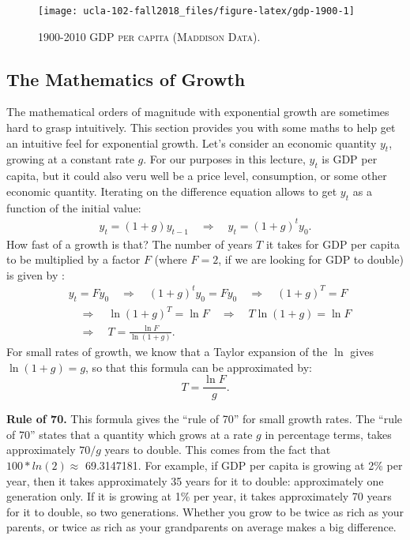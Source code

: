 \documentclass[]{book}
\theoremstyle{definition}
\theoremstyle{definition}
\theoremstyle{definition}
\theoremstyle{remark}
\begin{document}
\begin{figure}

{\centering \texttt{[image: ucla-102-fall2018\_files/figure-latex/gdp-1900-1]} 

}

\caption{\textsc{1900-2010 GDP per capita (Maddison Data)}.}\label{fig:gdp-1900}
\end{figure}

\subsection{The Mathematics of Growth}\label{the-mathematics-of-growth}

The mathematical orders of magnitude with exponential growth are
sometimes hard to grasp intuitively. This section provides you with some
maths to help get an intuitive feel for exponential growth. Let's
consider an economic quantity \(y_t\), growing at a constant rate \(g\).
For our purposes in this lecture, \(y_t\) is GDP per capita, but it
could also veru well be a price level, consumption, or some other
economic quantity. Iterating on the difference equation allows to get
\(y_t\) as a function of the initial value: \[
\begin{aligned}
y_t = (1+g)y_{t-1} \quad \Rightarrow \quad y_t = (1+g)^t y_0.
\end{aligned}
\] How fast of a growth is that? The number of years \(T\) it takes for
GDP per capita to be multiplied by a factor \(F\) (where \(F=2\), if we
are looking for GDP to double) is given by : \[
\begin{aligned}
&y_t = F y_0 \quad \Rightarrow \quad (1+g)^t y_0 = F y_0 \quad \Rightarrow \quad (1+g)^T = F \\
& \quad \Rightarrow \quad \ln (1+g)^T = \ln F \quad \Rightarrow \quad T \ln (1+g) = \ln F \\
& \quad \Rightarrow \quad T=\frac{\ln F}{\ln(1+g)}.
\end{aligned}
\] For small rates of growth, we know that a Taylor expansion of the
\(\ln\) gives \(\ln(1+g)=g\), so that this formula can be approximated
by: \[T = \frac{\ln F}{g}.\]

\textbf{Rule of 70.} This formula gives the ``rule of 70'' for small
growth rates. The ``rule of 70'' states that a quantity which grows at a
rate \(g\) in percentage terms, takes approximately \(70/g\) years to
double. This comes from the fact that \(100*ln(2) \approx\) 69.3147181.
For example, if GDP per capita is growing at 2\% per year, then it takes
approximately 35 years for it to double: approximately one generation
only. If it is growing at 1\% per year, it takes approximately 70 years
for it to double, so two generations. Whether you grow to be twice as
rich as your parents, or twice as rich as your grandparents on average
makes a big difference.
\end{document}
